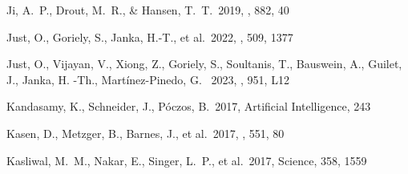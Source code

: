 \documentclass[twocolumn,twocolappendix]{aastex63}
\begin{document}
{\begin{thebibliography}{}


 Ji, A.~P., Drout, M.~R., \& Hansen, T.~T.\ 2019, \apj, 882, 40






 Just, O., Goriely, S., Janka, H.-T., et al.\ 2022, \mnras, 509, 1377

 Just, O., Vijayan, V., Xiong, Z., Goriely, S., Soultanis, T., Bauswein, A., Guilet, J., Janka, H. -Th., Martínez-Pinedo, G. \ 2023, \apjl, 951, L12


 Kandasamy, K., Schneider, J., P{\'o}czos, B.\ 2017, Artificial Intelligence, 243








 Kasen, D., Metzger, B., Barnes, J., et al.\ 2017, \nat, 551, 80




 Kasliwal, M.~M., Nakar, E., Singer, L.~P., et al.\ 2017, Science, 358, 1559









\end{thebibliography}}
\end{document}
